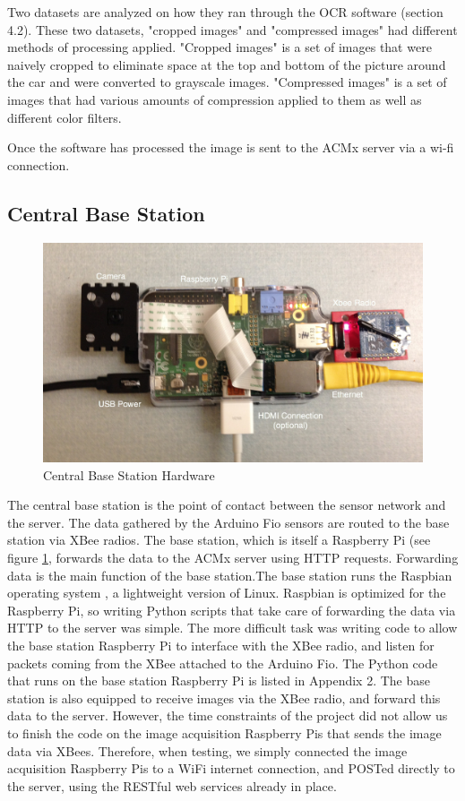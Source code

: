 \documentclass[11pt, oneside, fullpage, doublespace]{article}
\begin{document}
Two datasets are analyzed on how they ran through the OCR software (section 4.2). These two datasets, "cropped images" and "compressed images" had different methods of processing applied. "Cropped images" is a set of images that were naively cropped to eliminate space at the top and bottom of the picture around the car and were converted to grayscale images. "Compressed images" is a set of images that had various amounts of compression applied to them as well as different color filters.

Once the software has processed the image is sent to the ACMx server via a wi-fi connection.

\subsection{Central Base Station}
\begin{figure}
\begin{center}
\includegraphics[width=4.5in]{basestation}
\end{center}
\caption{Central Base Station Hardware}
\label{fig:basestation}
\end{figure}

The central base station is the point of contact between the sensor network and the server. The data gathered by the Arduino Fio sensors are routed to the base station via XBee radios. The base station, which is itself a Raspberry Pi (see figure \ref{fig:basestation}, forwards the data to the ACMx server using HTTP requests. Forwarding data is the main function of the base station.The base station runs the Raspbian operating system \cite{raspbian}, a lightweight version of Linux. Raspbian is optimized for the Raspberry Pi, so writing Python scripts that take care of forwarding the data via HTTP to the server was simple. The more difficult task was writing code to allow the base station Raspberry Pi to interface with the XBee radio, and listen for packets coming from the XBee attached to the Arduino Fio. The Python code that runs on the base station Raspberry Pi is listed in Appendix 2. The base station is also equipped to receive images via the XBee radio, and forward this data to the server. However, the time constraints of the project did not allow us to finish the code on the image acquisition Raspberry Pis that sends the image data via XBees. Therefore, when testing, we simply connected the image acquisition Raspberry Pis to a WiFi internet connection, and POSTed directly to the server, using the RESTful web services already in place.
\end{document}
